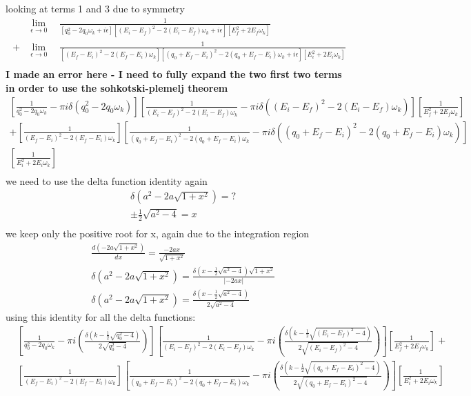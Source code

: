 looking at terms 1 and 3 due to symmetry
\begin{align*}
&\lim_{\epsilon \to 0}
\quad\frac{1}{
\left[q_0^2 - 2 q_0\omega_k + i\epsilon\right]
\left[(E_i - E_f)^2 - 2(E_i - E_f)\omega_k + i\epsilon\right]
\left[E_f^2 + 2 E_f\omega_k\right]
} \\
+ &\lim_{\epsilon \to 0}\quad \frac{1}{
\left[(E_f - E_i)^2 - 2(E_f - E_i)\omega_k\right]
\left[(q_0 + E_f - E_i)^2 - 2(q_0 + E_f - E_i)\omega_k + i\epsilon\right]
\left[E_i^2 + 2 E_i\omega_k\right]
} \\
\end{align*}
\textbf{I made an error here - I need to fully expand the two first two terms in order to use the sohkotski-plemelj theorem}
\begin{align*}
\left[\frac{1}{q_0^2 - 2 q_0\omega_k} - \pi i \delta(q_0^2 - 2 q_0\omega_k) \right]
\left[\frac{1}{(E_i - E_f)^2 - 2(E_i - E_f)\omega_k} - \pi i \delta((E_i - E_f)^2 - 2(E_i - E_f)\omega_k)\right]
\left[\frac{1}{E_f^2 + 2 E_f\omega_k}\right] \\
+
\left[\frac{1}{(E_f - E_i)^2 - 2(E_f - E_i)\omega_k}\right]
\left[\frac{1}{(q_0 + E_f - E_i)^2 - 2(q_0 + E_f - E_i)\omega_k} - \pi i \delta((q_0 + E_f - E_i)^2 - 2(q_0 + E_f - E_i)\omega_k)\right]\\
\left[\frac{1}{E_i^2 + 2 E_i\omega_k}\right] \\
\end{align*}
we need to use the delta function identity again
\begin{align*}
&\delta(a^2 - 2a\sqrt{1+x^2}) = ?\\
&\pm\frac{1}{2}\sqrt{a^2-4} = x\\
\end{align*}
we keep only the positive root for x, again due to the integration region
\begin{align*}
&\frac{d (-2a\sqrt{1+x^2})}{dx} = \frac{-2ax}{\sqrt{1+x^2}}\\
&\delta(a^2 - 2a\sqrt{1+x^2}) =  \frac{\delta(x-\frac{1}{2}\sqrt{a^2-4})\sqrt{1+x^2}}{|-2ax|}\\
&\delta(a^2 - 2a\sqrt{1+x^2}) =  \frac{\delta(x-\frac{1}{2}\sqrt{a^2-4})}{2\sqrt{a^2-4}}
\end{align*}
using this identity for all the delta functions:
\begin{align*}
&\left[\frac{1}{q_0^2 - 2 q_0\omega_k} - \pi i (\frac{\delta(k-\frac{1}{2}\sqrt{q_0^2-4})}{2\sqrt{q_0^2-4}}) \right]
\left[\frac{1}{(E_i - E_f)^2 - 2(E_i - E_f)\omega_k} - \pi i (\frac{\delta(k-\frac{1}{2}\sqrt{(E_i - E_f)^2-4})}{2\sqrt{(E_i - E_f)^2-4}}) \right]
\left[\frac{1}{E_f^2 + 2 E_f\omega_k}\right]+\\
&\left[\frac{1}{(E_f - E_i)^2 - 2(E_f - E_i)\omega_k}\right]
\left[\frac{1}{(q_0 + E_f - E_i)^2 - 2(q_0 + E_f - E_i)\omega_k} - \pi i (\frac{\delta(k-\frac{1}{2}\sqrt{(q_0 + E_f - E_i)^2-4})}{2\sqrt{(q_0 + E_f - E_i)^2-4}}) \right]
\left[\frac{1}{E_i^2 + 2 E_i\omega_k}\right] \\
\end{align*}
